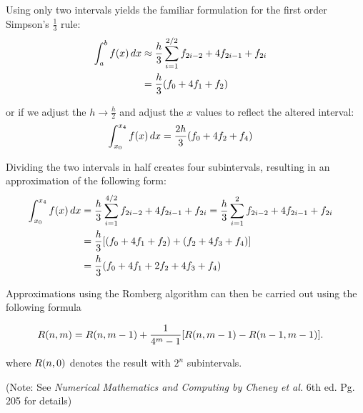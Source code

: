 \documentclass[12pt]{article}
\DeclarePairedDelimiter\rb{(}{)}
\DeclarePairedDelimiter\sqrb{[}{]}
\begin{document}
Using only two intervals yields the familiar formulation for the first order Simpson's \(\frac{1}{3}\) rule:
\begin{align*}
    \int_{a}^{b} {f \rb*{x}} \,d x & \approx
    \frac{h}{3} \sum_{i = 1}^{2 / 2} {f_{2i-2} + 4 f_{2i-1} + f_{2i}} &\\
& = \frac{h}{3} \rb*{f_{0} + 4 f_{1} + f_{2} }&\\
\end{align*}

or if we adjust the \(h \rightarrow \frac{h}{2}\) and  adjust the \(x\) values to reflect the altered interval: 
\begin{align*}
    \int_{x_{0}}^{x_{4}} {f \rb*{x}} \,d x & = 
    \frac{2 h}{3} \rb*{f_{0} + 4 f_{2} + f_{4}} &\\
\end{align*}

Dividing the two intervals in half creates four subintervals, resulting in an approximation of the following form:
\begin{align*}
    \int_{x_{0}}^{x_{4}} {f \rb*{x}} \,d  x & = 
    \frac{h}{3} \sum_{i = 1}^{4 / 2} {f_{2i - 2} + 4 f_{2 i -1} + f_{2i}} = 
    \frac{h}{3} \sum_{i = 1}^{ 2} {f_{2i - 2} + 4 f_{2 i -1} + f_{2i}}  &\\
    & = \frac{h}{3} \sqrb*{\rb*{
            f_{0} + 4 f_{1} + f_{2}
    } + \rb*{
        f_{2} + 4 f_{3} + f_{4}
}} &\\
& = \frac{h}{3} \rb*{f_{0} + 4 f_{1} + 2 f_{2} + 4 f_{3} + f_{4}} &\\
\end{align*}

Approximations using the Romberg algorithm can then be carried out using the following formula

\begin{align*}
    R \rb*{n,m} & =  R \rb*{n, m -1 } 
    + \frac{1}{4 ^{m} - 1} \sqrb*{R \rb*{n,m -1} - R \rb*{n - 1, m - 1}}. &\\
\end{align*}

where \(R \rb*{n,0}\) denotes the result with \(2^{n}\) subintervals. 

(Note: See \textit{Numerical Mathematics and Computing by Cheney et al.} 6th ed. Pg. 205 for details)
\end{document}
